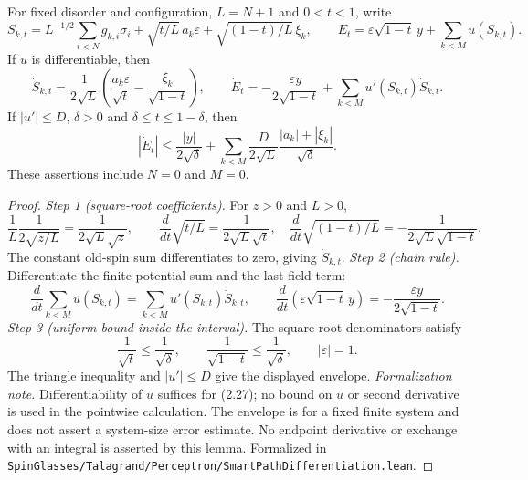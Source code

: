 \begin{lemma}\label{lem:sg-tal:perceptron-path-derivatives}
  \leanok
{}
For fixed disorder and configuration, $L=N+1$ and $0<t<1$, write
\[
 S_{k,t}=L^{-1/2}\sum_{i<N}g_{k,i}\sigma_i+\sqrt{t/L}\,a_k\varepsilon
        +\sqrt{(1-t)/L}\,\xi_k,\qquad
 E_t=\varepsilon\sqrt{1-t}\,y+\sum_{k<M}u(S_{k,t}).
\]
If $u$ is differentiable, then
\[
 \dot S_{k,t}=\frac1{2\sqrt L}\left(\frac{a_k\varepsilon}{\sqrt t}
                     -\frac{\xi_k}{\sqrt{1-t}}\right),\qquad
 \dot E_t=-\frac{\varepsilon y}{2\sqrt{1-t}}+\sum_{k<M}u'(S_{k,t})\dot S_{k,t}.
\]
If $|u'|\le D$, $\delta>0$ and $\delta\le t\le1-\delta$, then
\[
 |\dot E_t|\le\frac{|y|}{2\sqrt\delta}
 +\sum_{k<M}\frac{D}{2\sqrt L}\frac{|a_k|+|\xi_k|}{\sqrt\delta}.
\]
These assertions include $N=0$ and $M=0$.
\end{lemma}
\begin{proof}
  \leanok
\emph{Step 1 (square-root coefficients).} For $z>0$ and $L>0$,
\[
 \frac1L\frac1{2\sqrt{z/L}}=\frac1{2\sqrt L\sqrt z},\qquad
 \frac d{dt}\sqrt{t/L}=\frac1{2\sqrt L\sqrt t},\quad
 \frac d{dt}\sqrt{(1-t)/L}=-\frac1{2\sqrt L\sqrt{1-t}}.
\]
The constant old-spin sum differentiates to zero, giving $\dot S_{k,t}$.
\emph{Step 2 (chain rule).} Differentiate the finite potential sum and the last-field term:
\[
 \frac d{dt}\sum_{k<M}u(S_{k,t})=\sum_{k<M}u'(S_{k,t})\dot S_{k,t},\qquad
 \frac d{dt}(\varepsilon\sqrt{1-t}\,y)=-\frac{\varepsilon y}{2\sqrt{1-t}}.
\]
\emph{Step 3 (uniform bound inside the interval).} The square-root denominators satisfy
\[
 \frac1{\sqrt t}\le\frac1{\sqrt\delta},\qquad
 \frac1{\sqrt{1-t}}\le\frac1{\sqrt\delta},\qquad |\varepsilon|=1.
\]
The triangle inequality and $|u'|\le D$ give the displayed envelope.
\emph{Formalization note.} Differentiability of $u$ suffices for (2.27); no bound on $u$
or second derivative is used in the pointwise calculation. The envelope is for a fixed
finite system and does not assert a system-size error estimate. No endpoint derivative
or exchange with an integral is asserted by this lemma.
Formalized in \texttt{SpinGlasses/Talagrand/Perceptron/SmartPathDifferentiation.lean}.
\end{proof}

